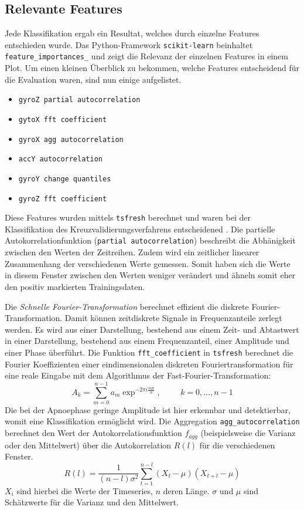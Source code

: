 \subsection{Relevante Features}
Jede Klassifikation ergab ein Resultat, welches durch einzelne Features entschieden wurde. 
Das Python-Framework \texttt{scikit-learn} beinhaltet \texttt{feature\_importances\_} und zeigt die Relevanz der einzelnen Features in einem Plot.
Um einen kleinen Überblick zu bekommen, welche Features entscheidend für die Evaluation waren, sind nun einige aufgelistet.
\begin{itemize}
    \item \texttt{gyroZ partial autocorrelation}
    \item \texttt{gytoX fft coefficient}
    \item \texttt{gyroX agg autocorrelation}
    \item \texttt{accY autocorrelation}
    \item \texttt{gyroY change quantiles }
    \item \texttt{gyroZ fft coefficient}
\end{itemize}
Diese Features wurden mittels \texttt{tsfresh} berechnet und waren bei der Klassifikation des Kreuzvalidierungsverfahrens entscheidened \cite{TsfreshTsfresh12}.
Die partielle Autokorrelationfunktion (\texttt{partial autocorrelation}) beschreibt die Abhänigkeit zwischen den Werten der Zeitreihen. 
Zudem wird ein zeitlicher linearer Zusammenhang der verschiedenen Werte gemessen.
Somit haben sich die Werte in diesem Fenster zwischen den Werten weniger verändert und ähneln somit eher den positiv markierten Trainingsdaten.

Die \textit{Schnelle Fourier-Transformation} berechnet effizient die diskrete Fourier-Transformation.
Damit können zeitdiskrete Signale in Frequenzanteile zerlegt werden. 
Es wird aus einer Darstellung, bestehend aus einem Zeit- und Abtastwert in einer Darstellung, bestehend aus einem Frequenzanteil, einer Amplitude und einer Phase überführt.
Die Funktion \texttt{fft\_coefficient} in \texttt{tsfresh} berechnet die Fourier Koeffizienten einer eindimensionalen diskreten Fouriertransformation für eine reale Eingabe mit dem Algorithmus der Fast-Fourier-Transformation:
\[A_k = \sum_{m=0}^{n-1} a_m \exp ^ {-2\pi i \frac{mk}{n}}, \hspace{1cm} k = 0,\dots,n-1\]
Die bei der Apnoephase geringe Amplitude ist hier erkennbar und detektierbar, womit eine Klassifikation ermöglicht wird.
Die Aggregation \texttt{agg\_autocorrelation} berechnet den Wert der Autokorrelationsfunktion $f_{agg}$ (beispielsweise die Varianz oder den Mittelwert) über die Autokorrelation $R(l)$ für die verschiedenen Fenster. 
\[R(l) = \frac{1}{(n-l)\sigma ^2} \sum_{t=1}^{n-l} (X_t - \mu) (X_{t+l} - \mu)\]
$X_i$ sind hierbei  die Werte der Timeseries, $n$ deren Länge. 
$\sigma$ und $\mu$ sind Schätzwerte für die Varianz und den Mittelwert.

